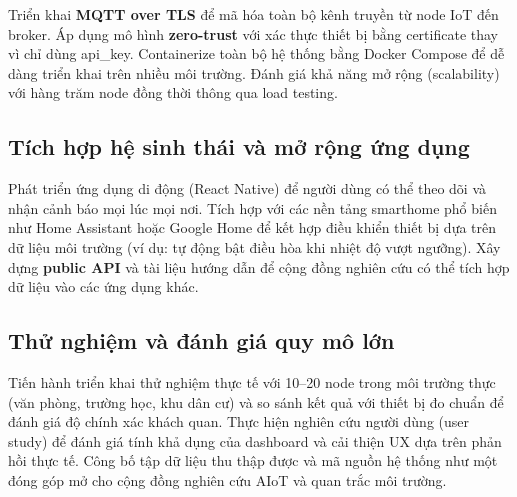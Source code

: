 Triển khai \textbf{MQTT over TLS} để mã hóa toàn bộ kênh truyền
từ node IoT đến broker. Áp dụng mô hình \textbf{zero-trust} với
xác thực thiết bị bằng certificate thay vì chỉ dùng api\_key.
Containerize toàn bộ hệ thống bằng Docker Compose để dễ dàng
triển khai trên nhiều môi trường. Đánh giá khả năng mở rộng
(scalability) với hàng trăm node đồng thời thông qua load testing.

\subsection{Tích hợp hệ sinh thái và mở rộng ứng dụng}
\label{subsec:future:integration}

Phát triển ứng dụng di động (React Native) để người dùng có thể
theo dõi và nhận cảnh báo mọi lúc mọi nơi. Tích hợp với các nền
tảng smarthome phổ biến như Home Assistant hoặc Google Home để
kết hợp điều khiển thiết bị dựa trên dữ liệu môi trường (ví dụ:
tự động bật điều hòa khi nhiệt độ vượt ngưỡng). Xây dựng
\textbf{public API} và tài liệu hướng dẫn để cộng đồng nghiên
cứu có thể tích hợp dữ liệu vào các ứng dụng khác.

\subsection{Thử nghiệm và đánh giá quy mô lớn}
\label{subsec:future:evaluation}

Tiến hành triển khai thử nghiệm thực tế với 10--20 node trong môi
trường thực (văn phòng, trường học, khu dân cư) và so sánh kết
quả với thiết bị đo chuẩn để đánh giá độ chính xác khách quan.
Thực hiện nghiên cứu người dùng (user study) để đánh giá tính
khả dụng của dashboard và cải thiện UX dựa trên phản hồi thực tế.
Công bố tập dữ liệu thu thập được và mã nguồn hệ thống như một
đóng góp mở cho cộng đồng nghiên cứu AIoT và quan trắc môi trường.
